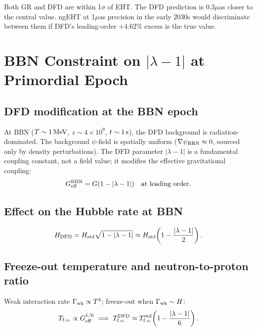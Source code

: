 \documentclass[11pt]{article}
\newcommand{\ee}[1]{\times 10^{#1}}
\newcommand{\lambdaone}{|\lambda-1|}
\begin{document}
Both GR and DFD are within 1$\sigma$ of EHT.  The DFD prediction is
0.3$\mu$as closer to the central value.  ngEHT at 1$\mu$as precision
in the early 2030s would discriminate between them if DFD's leading-order
$+4.62\%$ excess is the true value.

\section{BBN Constraint on $\lambdaone$ at Primordial Epoch}
\label{sec:bbn}

\subsection{DFD modification at the BBN epoch}

At BBN ($T \sim 1\,{\rm MeV}$, $z \sim 4\ee{9}$, $t \sim 1\,{\rm s}$),
the DFD background is radiation-dominated.  The background $\psi$-field
is spatially uniform ($\nabla\psi_{\rm BBN} \approx 0$, sourced only by
density perturbations).  The DFD parameter $\lambdaone$ is a fundamental
coupling constant, not a field value; it modifies the effective
gravitational coupling:
\begin{equation}
  G_{\rm eff}^{\rm BBN} = G(1 - \lambdaone) \quad\text{at leading order.}
\end{equation}

\subsection{Effect on the Hubble rate at BBN}

\begin{equation}
  H_{\rm DFD} = H_{\rm std}\sqrt{1 - \lambdaone} \approx H_{\rm std}\!\left(1 - \frac{\lambdaone}{2}\right).
\end{equation}

\subsection{Freeze-out temperature and neutron-to-proton ratio}

Weak interaction rate $\Gamma_{\rm wk} \propto T^5$; freeze-out when
$\Gamma_{\rm wk} \sim H$:
\begin{equation}
  T_{\rm f.o.} \propto G_{\rm eff}^{1/6}
  \implies
  T_{\rm f.o.}^{\rm DFD} \approx T_{\rm f.o.}^{\rm std}\!\left(1 - \frac{\lambdaone}{6}\right).
\end{equation}
\end{document}
